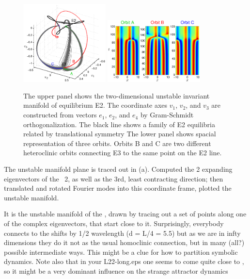 \begin{figure}[h]\vspace*{-5pt} \centering
\includegraphics[width=0.4\textwidth]{figs/ks22_E3_manifold.eps}
\includegraphics[width=0.45\textwidth]{figs/ks22_E3_orbits.eps}
\vspace*{-5pt}\caption{ {\small The upper panel shows the two-dimensional
unstable invariant manifold of equilibrium E2. The coordinate axes
$v_1$, $v_2$, and $v_3$ are constructed from vectors
$e_1$, $e_2$, and $e_4$ by Gram-Schmidt orthogonalization.
The black line shows a family of E2 equilibria related by translational
symmetry The lower panel shows spacial representation of
three orbits. Orbits B and C are two different heteroclinic orbits
connecting E3 to the same point on the E2 line.}}
\label{f:KS22E3man}\vspace*{-5pt}
\end{figure}



The unstable manifold plane is traced out in
(a). Computed the 2 expanding eigenvectors
of the \eqv\ {\nameit}2, as well as the 3rd, least contracting
direction; then translated and rotated Fourier modes into this
coordinate frame, plotted the unstable manifold.


 It is the unstable manifold of the 
{\eqv}, drawn by tracing out a set of points along one of the complex
eigenvectors, that start close to it. Surprisingly, everybody connects
to the  shifts by 1/2 wavelength (d = L/4 = 5.5) but as we are in
infty dimensions they do it not as the usual homoclinic connection, but in
many (all?) possible intermediate ways. This might be a clue for how to
partition symbolic dynamics. Note also that in your L22-long.eps one seems
to come quite close to  {\eqv}, so it might be a very dominant
influence on the strange attractor dynamics



